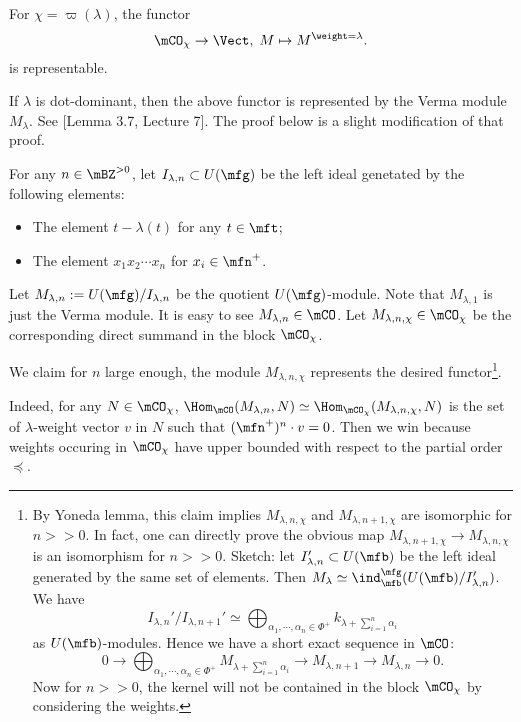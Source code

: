 	\begin{lem}
		\label{lem-weigth-reprentable}
		For $\chi = \varpi(\lambda)$, the functor
		\[
			\mCO_\chi \to \Vect,\; M \mapsto M^{\weight = \lambda}.
		\]
		is representable.
	\end{lem}

	\begin{rem}
		If $\lambda$ is dot-dominant, then the above functor is represented by the Verma module $M_\lambda$. See [Lemma 3.7, Lecture 7]. The proof below is a slight modification of that proof.
	\end{rem}

	\proof
		For any $n\in \mBZ^{>0}$, let $I_{\lambda,n}\subset U(\mfg)$ be the left ideal genetated by the following elements:
		\begin{itemize}
			\item The element $t-\lambda(t)$ for any $t\in \mft$;
			\item The element $x_1x_2\cdots x_n$ for $x_i\in \mfn^+$.
		\end{itemize}
		Let $M_{\lambda,n}:=U(\mfg)/I_{\lambda,n}$ be the quotient $U(\mfg)$-module. Note that $M_{\lambda,1}$ is just the Verma module. It is easy to see $M_{\lambda,n}\in \mCO$. Let $M_{\lambda,n,\chi}\in \mCO_\chi$ be the corresponding direct summand in the block $\mCO_\chi$.

		We claim for $n$ large enough, the module $M_{\lambda,n,\chi}$ represents the desired functor\footnote{By Yoneda lemma, this claim implies $M_{\lambda,n,\chi}$ and $M_{\lambda,n+1,\chi}$ are isomorphic for $n>>0$. In fact, one can directly prove the obvious map $M_{\lambda,n+1,\chi} \to M_{\lambda,n,\chi}$ is an isomorphism for $n>>0$. Sketch: let $I_{\lambda,n}' \subset U(\mfb)$ be the left ideal generated by the same set of elements. Then $M_{\lambda}\simeq \ind_\mfb^\mfg( U(\mfb)/I_{\lambda,n}' )$. We have 
		\[
			I_{\lambda,n}'/I_{\lambda,n+1}' \simeq \bigoplus_{\alpha_1,\cdots,\alpha_n\in \Phi^+} k_{\lambda+\sum_{i=1}^n \alpha_i}
		\]
		as $U(\mfb)$-modules. Hence we have a short exact sequence in $\mCO$:
		\[
			0 \to \bigoplus_{\alpha_1,\cdots,\alpha_n\in \Phi^+} M_{\lambda+\sum_{i=1}^n \alpha_i} \to M_{\lambda,n+1} \to M_{\lambda,n} \to 0.
		\]
		Now for $n>>0$, the kernel will not be contained in the block $\mCO_\chi$ by considering the weights.
		}. 

		Indeed, for any $N\in \mCO_\chi$, $\Hom_{\mCO}(M_{\lambda,n},N) \simeq \Hom_{\mCO_\chi}(M_{\lambda,n,\chi},N)$ is the set of $\lambda$-weight vector $v$ in $N$ such that $(\mfn^+)^n\cdot v = 0$. Then we win because weights occuring in $ \mCO_\chi$ have upper bounded with respect to the partial order $\preceq$.


